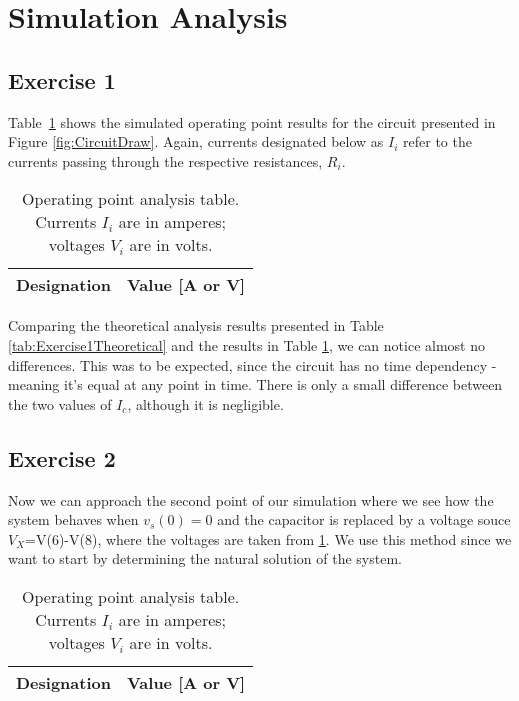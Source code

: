 \section{Simulation Analysis}
\label{sec:simulation}

\subsection{Exercise 1}

Table~\ref{tab:Exercise1Simulation} shows the simulated operating point results for the circuit presented in Figure \ref{fig:CircuitDraw}. Again, currents designated below as $I_i$ refer to the currents passing through the respective resistances, $R_i$.

\begin{table}[H]
  \centering
  \begin{tabular}{|c|c|}
    \hline    
    {\bf Designation} & {\bf Value [A or V]} \\ \hline
    
  \end{tabular}
  \caption{Operating point analysis table. Currents $I_i$ are in amperes; voltages $V_i$ are in volts.}
  \label{tab:Exercise1Simulation}
\end{table}

Comparing the theoretical analysis results presented in Table \ref{tab:Exercise1Theoretical} and the results in Table \ref{tab:Exercise1Simulation}, we can notice almost no differences. This was to be expected, since the circuit has no time dependency - meaning it's equal at any point in time. There is only a small difference between the two values of $I_c$, although it is negligible.

\subsection{Exercise 2}

Now we can approach the second point of our simulation where we see how the system behaves when $v_s(0)=0$ and the capacitor is replaced by a voltage souce $V_X$=V(6)-V(8), where the voltages are taken from \ref{tab:Exercise1Simulation}.
We use this method since we want to start by determining the natural solution of the system.

\begin{table}[H]
  \centering
  \small
  \begin{tabular}{|c|c|}
    \hline    
    {\bf Designation} & {\bf Value [A or V]} \\ \hline
    
  \end{tabular}
  \caption{Operating point analysis table. Currents $I_i$ are in amperes; voltages $V_i$ are in volts.}
  \label{tab:Exercise2Simulation}
\end{table}

